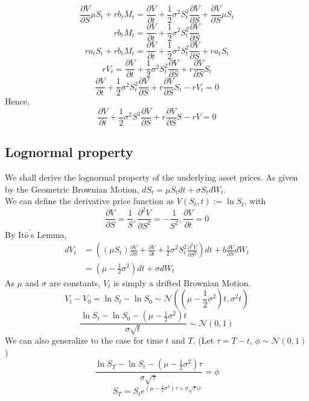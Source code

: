 \begin{center}
$$\frac{\partial V}{\partial S}\mu S_{t} + rb_{t}M_{t} = \frac{\partial V}{\partial t}+\frac{1}{2}\sigma^{2}S_{t}^{2}\frac{\partial V}{\partial S}+\frac{\partial V}{\partial S}\mu S_{t}$$
$$rb_{t}M_{t} = \frac{\partial V}{\partial t}+\frac{1}{2}\sigma^{2}S_{t}^{2}\frac{\partial V}{\partial S}$$
$$ra_{t}S_{t}+rb_{t}M_{t} = \frac{\partial V}{\partial t}+\frac{1}{2}\sigma^{2}S_{t}^{2}\frac{\partial V}{\partial S}+ra_{t}S_{t}$$
$$rV_{t} = \frac{\partial V}{\partial t}+\frac{1}{2}\sigma^{2}S_{t}^{2}\frac{\partial V}{\partial S}+r\frac{\partial V}{\partial S}S_{t}$$
$$\frac{\partial V}{\partial t}+\frac{1}{2}\sigma^{2}S_{t}^{2}\frac{\partial V}{\partial S}+r\frac{\partial V}{\partial S}S_{t}- rV_{t} = 0$$
Hence,
$$\frac{\partial V}{\partial t}+\frac{1}{2}\sigma^{2}S^{2}\frac{\partial V}{\partial S}+r\frac{\partial V}{\partial S}S- rV = 0$$
\end{center}
\newpage
\subsection{Lognormal property}
We shall derive the lognormal property of the underlying asset prices.
As given by the Geometric Brownian Motion, $dS_{t}  = \mu S_{t}dt + \sigma S_{t} dW_{t}$.\\
We can define the derivative price function as $V(S_{t}, t) := \ln{S_{t}}$, with \\
$$\frac{\partial V}{\partial S} = \frac{1}{S}, \frac{\partial^{2} V}{\partial S^{2}} = -\frac{1}{S^{2}} , \frac{\partial V}{\partial t} = 0$$
By It$\hat{o}^{\prime}$s Lemma,
\begin{equation}
\begin{split}
dV_{t}
&= ((\mu S_{t})\frac{\partial V}{\partial S} + \frac{\partial V}{\partial t} + \frac{1}{2}\sigma^{2}S_{t}^{2}\frac{\partial^{2} V}{\partial S^{2}})dt + b\frac{\partial V}{\partial S}dW_{t}\\
&= (\mu - \frac{1}{2}\sigma^{2})dt + \sigma dW_{t}
\end{split}
\end{equation}
As $\mu$ and $\sigma$ are constants, $V_{t}$ is simply a drifted Brownian Motion.\\
$$V_{t} - V_{0} = \ln{S_{t}} - \ln{S_{0}} \sim \mathcal{N}((\mu - \frac{1}{2}\sigma^{2})t, \sigma^{2}t)$$
$$\frac{\ln{S_{t}} - \ln{S_{0}} - (\mu - \frac{1}{2}\sigma^{2})t}{\sigma\sqrt{t}} \sim \mathcal{N}(0,1)$$
We can also generalize to the case for time $t$ and $T$. (Let $\tau = T - t$, $\phi \sim \mathcal{N}(0,1)$)
$$\frac{\ln{S_{T}} - \ln{S_{t}} - (\mu - \frac{1}{2}\sigma^{2})\tau}{\sigma\sqrt{\tau}} = \phi $$
$$S_{T} = S_{t}e^{(\mu - \frac{1}{2}\sigma^{2})\tau + \sigma\sqrt{\tau}\phi}$$
\newpage

